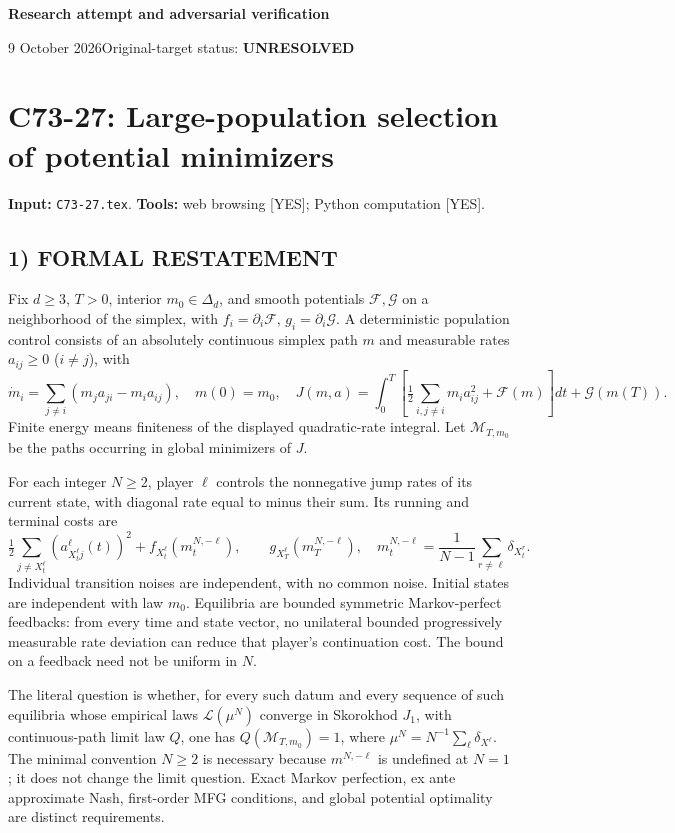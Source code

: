 \documentclass[11pt,a4paper]{article}
\theoremstyle{definition}
\theoremstyle{remark}
\begin{document}
{\large\bfseries Research attempt and adversarial verification}\par
9 October 2026\hfill Original-target status: \textbf{UNRESOLVED}\par
\section{C73-27: Large-population selection of potential minimizers}
\label{sec:C73-27}
\noindent\textbf{Input:} \texttt{C73-27.tex}. \quad\textbf{Tools:} web browsing [YES]; Python computation [YES].
\subsection*{1) FORMAL RESTATEMENT}
Fix $d\geq3$, $T>0$, interior $m_0\in\Delta_d$, and smooth potentials $\mathcal F,\mathcal G$ on a neighborhood of the simplex, with $f_i=\partial_i\mathcal F$, $g_i=\partial_i\mathcal G$. A deterministic population control consists of an absolutely continuous simplex path $m$ and measurable rates $a_{ij}\geq0$ ($i\ne j$), with
\[
 \dot m_i=\sum_{j\ne i}(m_ja_{ji}-m_ia_{ij}),\quad m(0)=m_0,
 \quad J(m,a)=\int_0^T\left[\tfrac12\sum_{i,j\ne i}m_i a_{ij}^2+
 \mathcal F(m)\right]dt+\mathcal G(m(T)).
\]
Finite energy means finiteness of the displayed quadratic-rate integral. Let $\mathcal M_{T,m_0}$ be the paths occurring in global minimizers of $J$.

For each integer $N\geq2$, player $\ell$ controls the nonnegative jump rates of its current state, with diagonal rate equal to minus their sum. Its running and terminal costs are
\[
 \tfrac12\sum_{j\ne X_t^\ell}(a_{X_t^\ell j}^\ell(t))^2+
 f_{X_t^\ell}(m_t^{N,-\ell}),\qquad
 g_{X_T^\ell}(m_T^{N,-\ell}),\quad
 m_t^{N,-\ell}=\frac1{N-1}\sum_{r\ne\ell}\delta_{X_t^r}.
\]
Individual transition noises are independent, with no common noise. Initial states are independent with law $m_0$. Equilibria are bounded symmetric Markov-perfect feedbacks: from every time and state vector, no unilateral bounded progressively measurable rate deviation can reduce that player's continuation cost. The bound on a feedback need not be uniform in $N$.

The literal question is whether, for every such datum and every sequence of such equilibria whose empirical laws $\mathcal L(\mu^N)$ converge in Skorokhod $J_1$, with continuous-path limit law $Q$, one has $Q(\mathcal M_{T,m_0})=1$, where $\mu^N=N^{-1}\sum_\ell\delta_{X^\ell}$. The minimal convention $N\geq2$ is necessary because $m^{N,-\ell}$ is undefined at $N=1$; it does not change the limit question. Exact Markov perfection, ex ante approximate Nash, first-order MFG conditions, and global potential optimality are distinct requirements.
\end{document}
